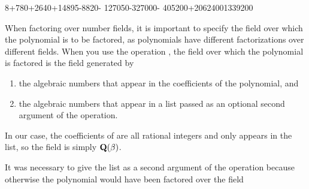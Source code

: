 {{{{{{{{{{{{{{{{{{\begin{xtc}
\begin{TeXOutput}
\begin{fricasmath}{8}
{{{{}{8}}+780\TIMES {}+2640\TIMES {}+14895\TIMES {}-{8820\TIMES {}}-{%
127050\TIMES {}}-{327000\TIMES {}}-{%
405200\TIMES {}}+2062400}{1339200}}\TIMES {}%
\TIMES {}\TIMES %
\TIMES {}%
\end{fricasmath}
\end{TeXOutput}
\end{xtc}
%
When factoring over number fields, it is important to specify the
field over which the polynomial is to be factored, as polynomials
have different factorizations over different fields.
When you use the operation , the field over which
the polynomial is factored is the field generated by
\begin{enumerate}
\item the algebraic numbers that appear
in the coefficients of the polynomial, and
\item the algebraic numbers that
appear in a list passed as an optional second argument of the operation.
\end{enumerate}
In our case, the coefficients of 
are all rational integers and only 
appears in the list, so the field is simply
${\bf Q}(\beta)$.
%
\begin{xtc}
\begin{xtccomment}
It was necessary to give the list \spad{[beta]}
as a second argument of the operation
because otherwise the polynomial would have been factored over the field

\end{xtccomment}
\end{xtc}}}}}}}}}}}}}}}}}}}
